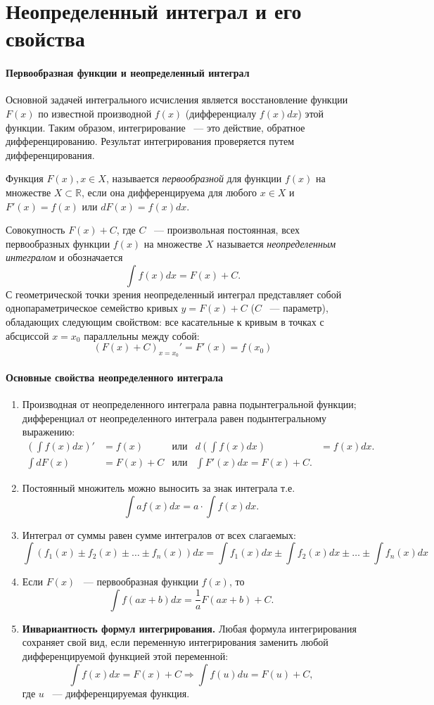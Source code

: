 \documentclass[11pt]{article}
\begin{document}
	\section{Неопределенный интеграл и его свойства}
	\paragraph*{Первообразная функции и неопределенный интеграл}
	Основной задачей интегрального исчисления является восстановление функции $F(x)$ по известной производной $f(x)$ (дифференциалу $f(x)dx$) этой функции. Таким образом, интегрирование ~--- это действие, обратное дифференцированию. Результат интегрирования проверяется путем дифференцирования.

	Функция $F(x), x\in X$, называется {\itshape первообразной} для функции $f(x)$ на множестве $X\subset\mathbb{R}$, если она дифференцируема для любого $x\in X$ и $F'(x) = f(x)$ или $dF(x)=f(x)dx$.

	Совокупность $F(x)+C$, где $C$ ~--- произвольная постоянная, всех первообразных функции $f(x)$ на множестве $X$ называется \textit{неопределенным интегралом} и обозначается
	$$
		\int{f(x)dx} = F(x) + C.
	$$
	С геометрической точки зрения неопределенный интеграл представляет собой однопараметрическое семейство кривых $y = F(x) + C$ ($C$ ~--- параметр), обладающих следующим свойством: все касательные к кривым в точках с абсциссой $x = x_0$ параллельны между собой:
	$$
		(F(x) + C)_{x = x_0}' = F'(x) = f(x_0)
	$$
	\paragraph*{Основные свойства неопределенного интеграла}
	\begin{enumerate}
		\item Производная от неопределенного интеграла равна подынтегральной функции; дифференциал от неопределенного интеграла равен подынтегральному выражению:
		\begin{align}
			\left(\int{f(x)dx}\right)' &= f(x) & \text{или} & d\left(\int{f(x)dx}\right) &= f(x)dx.\\
			\int{dF(x)} &= F(x) + C & \text{или} & \int{F'(x)dx} = F(x) + C.
		\end{align}
		\item Постоянный множитель можно выносить за знак интеграла т.е.
		$$
			\int{af(x)dx} = a\cdot\int{f(x)dx}.
		$$
		\item Интеграл от суммы равен сумме интегралов от всех слагаемых:
		$$
			\int{\left(f_1(x)\pm f_2(x)\pm\ldots\pm f_n(x)\right)dx} = \int{f_1(x)dx}\pm\int{f_2(x)dx}\pm\ldots\pm\int{f_n(x)dx}
		$$
		\item Если $F(x)$ ~--- первообразная функции $f(x)$, то
		$$
			\int{f(ax + b)dx} = \frac{1}{a}F(ax + b) + C.
		$$
		\item\textbf{Инвариантность формул интегрирования.} Любая формула интегрирования сохраняет свой вид, если переменную интегрирования заменить любой дифференцируемой функцией этой переменной:
		$$
			\int{f(x)dx} = F(x) + C \Rightarrow \int{f(u)du} = F(u) + C,
		$$
		где $u$ ~--- дифференцируемая функция.
	\end{enumerate}
\end{document}

